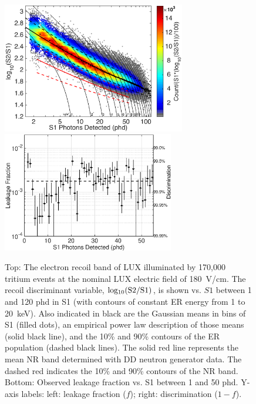 \begin{figure}[h!]
\includegraphics[width=80mm]{fig/CH3T_ER_Band_log.eps} %
\includegraphics[width=75mm]{fig/CH3T_Leakage_Run03.eps}
\caption{Top: The electron recoil band of LUX illuminated by 170,000 tritium events at the nominal LUX electric field of 180~V/cm.  The recoil discriminant variable, $\rm log_{10}(S2/S1)$, is shown vs. $S1$ between 1 and 120 phd in S1 (with contours of constant ER energy from 1 to 20~keV). Also indicated in black are the Gaussian means in bins of S1 (filled dots), an empirical power law description of those means (solid black line), and the 10\% and 90\% contours of the ER population (dashed black lines). The solid red line represents the mean NR band determined with DD neutron generator data. The dashed red indicates the 10\% and 90\% contours of the NR band. Bottom: Observed leakage fraction vs. S1 between 1 and 50 phd. Y-axis labels: left: leakage fraction ($f$); right: discrimination ($1-f$).}
\label{fig:ER_band}
\end{figure}


